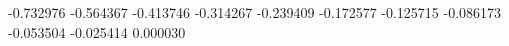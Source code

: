 -0.732976
-0.564367
-0.413746
-0.314267
-0.239409
-0.172577
-0.125715
-0.086173
-0.053504
-0.025414
0.000030
